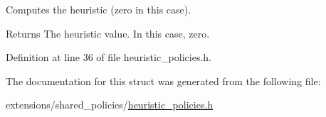 Computes the heuristic (zero in this case). 

\begin{DoxyReturn}{Returns}
The heuristic value. In this case, zero. 
\end{DoxyReturn}


Definition at line 36 of file heuristic\+\_\+policies.\+h.



The documentation for this struct was generated from the following file\+:\begin{DoxyCompactItemize}
\item 
extensions/shared\+\_\+policies/\hyperlink{heuristic__policies_8h}{heuristic\+\_\+policies.\+h}\end{DoxyCompactItemize}
